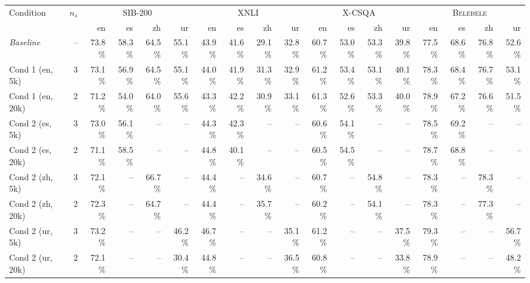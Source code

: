 \begin{table}[t]
  \centering
  \scriptsize
  \begin{tabular}{lrrrrrrrrrrrrrrrrr}
    \toprule
    Condition & $n_s$ & \multicolumn{4}{c}{\textsc{SIB-200}} & \multicolumn{4}{c}{\textsc{XNLI}} & \multicolumn{4}{c}{\textsc{X-CSQA}} & \multicolumn{4}{c}{\textsc{Belebele}} \\
    \cmidrule(lr){3-6} \cmidrule(lr){7-10} \cmidrule(lr){11-14} \cmidrule(lr){15-18}
     & & en & es & zh & ur & en & es & zh & ur & en & es & zh & ur & en & es & zh & ur \\
    \midrule
    \textit{Baseline} & -- & 73.8\% & 58.3\% & 64.5\% & 55.1\% & 43.9\% & 41.6\% & 29.1\% & 32.8\% & 60.7\% & 53.0\% & 53.3\% & 39.8\% & 77.5\% & 68.6\% & 76.8\% & 52.6\% \\
    Cond 1 (en, 5k) & 3 & 73.1\% & 56.9\% & 64.5\% & 55.1\% & 44.0\% & 41.9\% & 31.3\% & 32.9\% & 61.2\% & 53.4\% & 53.1\% & 40.1\% & 78.3\% & 68.4\% & 76.7\% & 53.1\% \\
    Cond 1 (en, 20k) & 2 & 71.2\% & 54.0\% & 64.0\% & 55.6\% & 43.3\% & 42.2\% & 30.9\% & 33.1\% & 61.3\% & 52.6\% & 53.3\% & 40.0\% & 78.9\% & 67.2\% & 76.6\% & 51.5\% \\
    Cond 2 (es, 5k) & 3 & 73.0\% & 56.1\% & -- & -- & 44.3\% & 42.3\% & -- & -- & 60.6\% & 54.1\% & -- & -- & 78.5\% & 69.2\% & -- & -- \\
    Cond 2 (es, 20k) & 2 & 71.1\% & 58.5\% & -- & -- & 44.8\% & 40.1\% & -- & -- & 60.5\% & 54.5\% & -- & -- & 78.7\% & 68.8\% & -- & -- \\
    Cond 2 (zh, 5k) & 3 & 72.1\% & -- & 66.7\% & -- & 44.4\% & -- & 34.6\% & -- & 60.7\% & -- & 54.8\% & -- & 78.3\% & -- & 78.3\% & -- \\
    Cond 2 (zh, 20k) & 2 & 72.3\% & -- & 64.7\% & -- & 44.4\% & -- & 35.7\% & -- & 60.2\% & -- & 54.1\% & -- & 78.3\% & -- & 77.3\% & -- \\
    Cond 2 (ur, 5k) & 3 & 73.2\% & -- & -- & 46.2\% & 46.7\% & -- & -- & 35.1\% & 61.2\% & -- & -- & 37.5\% & 79.3\% & -- & -- & 56.7\% \\
    Cond 2 (ur, 20k) & 2 & 72.1\% & -- & -- & 30.4\% & 44.8\% & -- & -- & 36.5\% & 60.8\% & -- & -- & 33.8\% & 78.9\% & -- & -- & 48.2\% \\

\end{tabular}
\end{table}

